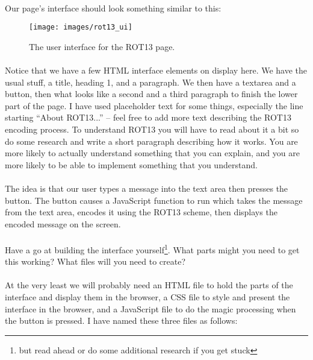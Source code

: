 \documentclass[10pt, a4paper, twosize]{article}
\begin{document}
\paragraph{} Our page's interface should look something similar to this:

\begin{figure}[H]
\centering
\texttt{[image: images/rot13\_ui]}
\caption{The user interface for the ROT13 page.}
\label{fig:rot13_ui}
\end{figure}

\paragraph{} Notice that we have a few HTML interface elements on display here. We have the usual stuff, a title, heading 1, and a paragraph. We then have a textarea and a button, then what looks like a second and a third paragraph to finish the lower part of the page. I have used placeholder text for some things, especially the line starting ``About ROT13...'' -- feel free to add more text describing the ROT13 encoding process. To understand ROT13 you will have to read about it a bit so do some research and write a short paragraph describing how it works. You are more likely to actually understand something that you can explain, and you are more likely to be able to implement something that you understand.

\paragraph{} The idea is that our user types a message into the text area then presses the button. The button causes a JavaScript function to run which takes the message from the text area, encodes it using the ROT13 scheme, then displays the encoded message on the screen.

\paragraph{} Have a go at building the interface yourself\footnote{but read ahead or do some additional research if you get stuck}. What parts might you need to get this working? What files will you need to create?

\paragraph{} At the very least we will probably need an HTML file to hold the parts of the interface and display them in the browser, a CSS file to style and present the interface in the browser, and a JavaScript file to do the magic processing when the button is pressed. I have named these three files as follows:
\end{document}
